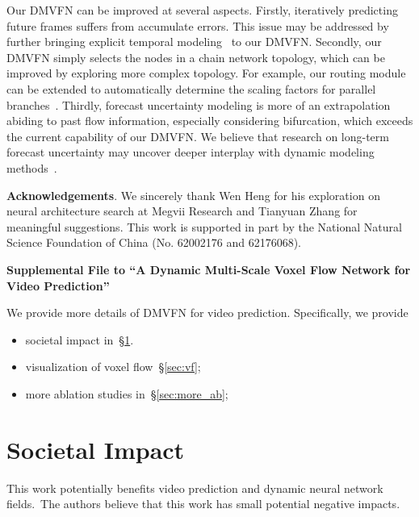 \documentclass[10pt,twocolumn,letterpaper]{article}
\begin{document}
Our DMVFN can be improved at several aspects. Firstly, iteratively predicting future frames suffers from accumulate errors.
This issue may be addressed by further bringing explicit temporal modeling~\cite{qvi,TMNet2021,ifrnet,rife} to our DMVFN.
Secondly, our DMVFN simply selects the nodes in a chain network topology, which can be improved by exploring more complex topology. For example, our routing module can be extended to automatically determine the scaling factors for parallel branches~\cite{darts}.
Thirdly, forecast uncertainty modeling is more of an extrapolation abiding to past flow information, especially considering bifurcation, which exceeds the current capability of our DMVFN. We believe that research on long-term forecast uncertainty may uncover deeper interplay with dynamic modeling methods~\cite{ha2018world,akan2021slamp}.


\noindent
\textbf{Acknowledgements}. We sincerely thank Wen Heng for his exploration on neural architecture search at Megvii Research and Tianyuan Zhang for meaningful suggestions. This work is supported in part by the National Natural Science Foundation of China (No. 62002176 and 62176068).         \clearpage
	{\small
		    
		
	}
        \clearpage
        \onecolumn
        

\begin{center}\Large{\textbf{Supplemental File to ``A Dynamic Multi-Scale Voxel Flow Network for Video Prediction''}}
\end{center}

We provide 
more details of DMVFN for video prediction.
Specifically, we provide
\begin{itemize}
\itemsep-0.03in
\item societal impact in~\S\ref{sec:impact}.

\item visualization of voxel flow~\S\ref{sec:vf};

\item more ablation studies in~\S\ref{sec:more_ab};

\end{itemize}

\section{Societal Impact}
\label{sec:impact}
This work potentially benefits video prediction and dynamic neural network fields.\ The authors believe that this work has small potential negative impacts.
\end{document}
